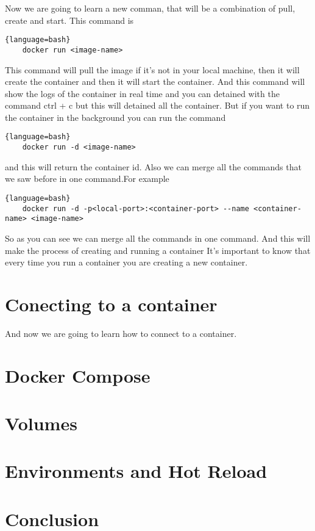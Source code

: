 \documentclass{article}
\begin{document}
Now we are going to learn a new comman, that will be a combination of pull, create and start. This command is 
\begin{lstlisting}{language=bash}
    docker run <image-name>
\end{lstlisting}

This command will pull the image if it's not in your local machine, then it will create the container and 
then it will start the container. And this command will show the logs of the container in real time and you can 
detained with the command ctrl + c but this will detained all the container. But if you want to run the container 
in the background you can run the command
\begin{lstlisting}{language=bash}
    docker run -d <image-name>
\end{lstlisting}

and this will return the container id.  Also we can merge all the commands that we saw before in one command.For example
\begin{lstlisting}{language=bash}
    docker run -d -p<local-port>:<container-port> --name <container-name> <image-name>
\end{lstlisting}

So as you can see we can merge all the commands in one command. And this will make the process of creating and running a container
It's important to know that every time you run a container you are creating a new container. 

\section*{Conecting to a container}
And now we are going to learn how to connect to a container.
\section*{Docker Compose}
\section*{Volumes}
\section*{Environments and Hot Reload}


\section*{Conclusion}
\end{document}
